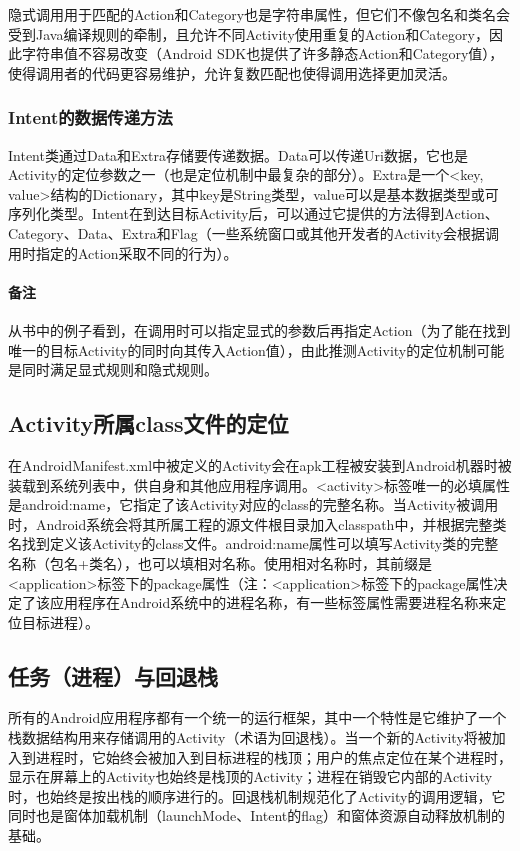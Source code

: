 \documentclass[UTF8]{ctexart}
\begin{document}
		隐式调用用于匹配的Action和Category也是字符串属性，但它们不像包名和类名会受到Java编译规则的牵制，且允许不同Activity使用重复的Action和Category，因此字符串值不容易改变（Android SDK也提供了许多静态Action和Category值），使得调用者的代码更容易维护，允许复数匹配也使得调用选择更加灵活。
		\subsubsection{Intent的数据传递方法}
		Intent类通过Data和Extra存储要传递数据。Data可以传递Uri数据，它也是Activity的定位参数之一（也是定位机制中最复杂的部分）。Extra是一个<key, value>结构的Dictionary，其中key是String类型，value可以是基本数据类型或可序列化类型。Intent在到达目标Activity后，可以通过它提供的方法得到Action、Category、Data、Extra和Flag（一些系统窗口或其他开发者的Activity会根据调用时指定的Action采取不同的行为）。

	\paragraph{备注} 从书中的例子看到，在调用时可以指定显式的参数后再指定Action（为了能在找到唯一的目标Activity的同时向其传入Action值），由此推测Activity的定位机制可能是同时满足显式规则和隐式规则。
    \subsection{Activity所属class文件的定位}
    在AndroidManifest.xml中被定义的Activity会在apk工程被安装到Android机器时被装载到系统列表中，供自身和其他应用程序调用。<activity>标签唯一的必填属性是android:name，它指定了该Activity对应的class的完整名称。当Activity被调用时，Android系统会将其所属工程的源文件根目录加入classpath中，并根据完整类名找到定义该Activity的class文件。android:name属性可以填写Activity类的完整名称（包名+类名），也可以填相对名称。使用相对名称时，其前缀是<application>标签下的package属性（注：<application>标签下的package属性决定了该应用程序在Android系统中的进程名称，有一些标签属性需要进程名称来定位目标进程）。
    \subsection{任务（进程）与回退栈}
    所有的Android应用程序都有一个统一的运行框架，其中一个特性是它维护了一个栈数据结构用来存储调用的Activity（术语为回退栈）。当一个新的Activity将被加入到进程时，它始终会被加入到目标进程的栈顶；用户的焦点定位在某个进程时，显示在屏幕上的Activity也始终是栈顶的Activity；进程在销毁它内部的Activity时，也始终是按出栈的顺序进行的。回退栈机制规范化了Activity的调用逻辑，它同时也是窗体加载机制（launchMode、Intent的flag）和窗体资源自动释放机制的基础。
\end{document}

